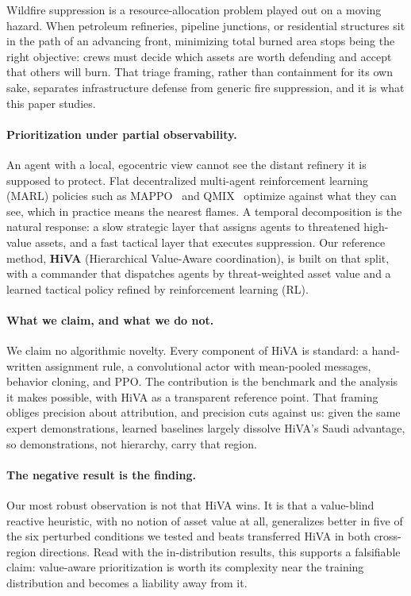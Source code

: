 \documentclass[letterpaper]{article}
\begin{document}
Wildfire suppression is a resource-allocation problem played out on a moving hazard. When petroleum refineries, pipeline junctions, or residential structures sit in the path of an advancing front, minimizing total burned area stops being the right objective: crews must decide which assets are worth defending and accept that others will burn. That triage framing, rather than containment for its own sake, separates infrastructure defense from generic fire suppression, and it is what this paper studies.

\paragraph{Prioritization under partial observability.} An agent with a local, egocentric view cannot see the distant refinery it is supposed to protect. Flat decentralized multi-agent reinforcement learning (MARL) policies such as MAPPO~\citep{yu2022mappo} and QMIX~\citep{rashid2018qmix} optimize against what they can see, which in practice means the nearest flames. A temporal decomposition is the natural response: a slow strategic layer that assigns agents to threatened high-value assets, and a fast tactical layer that executes suppression. Our reference method, \textbf{HiVA} (Hierarchical Value-Aware coordination), is built on that split, with a commander that dispatches agents by threat-weighted asset value and a learned tactical policy refined by reinforcement learning (RL).

\paragraph{What we claim, and what we do not.} We claim no algorithmic novelty. Every component of HiVA is standard: a hand-written assignment rule, a convolutional actor with mean-pooled messages, behavior cloning, and PPO. The contribution is the benchmark and the analysis it makes possible, with HiVA as a transparent reference point. That framing obliges precision about attribution, and precision cuts against us: given the same expert demonstrations, learned baselines largely dissolve HiVA's Saudi advantage, so demonstrations, not hierarchy, carry that region.

\paragraph{The negative result is the finding.} Our most robust observation is not that HiVA wins. It is that a value-blind reactive heuristic, with no notion of asset value at all, generalizes better in five of the six perturbed conditions we tested and beats transferred HiVA in both cross-region directions. Read with the in-distribution results, this supports a falsifiable claim: value-aware prioritization is worth its complexity near the training distribution and becomes a liability away from it.
\end{document}
